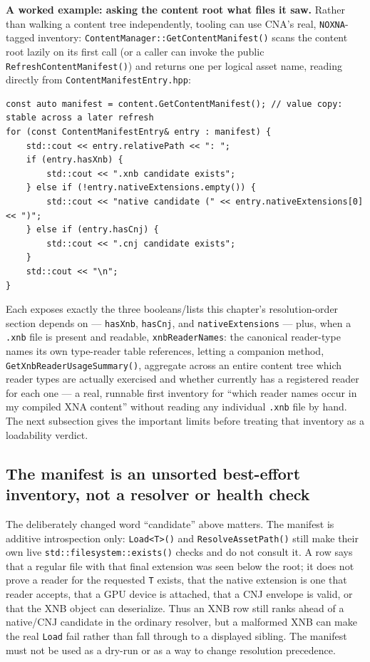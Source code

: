 \begin{sourcenote}
\textbf{A worked example: asking the content root what files it saw.} Rather than walking a
content tree independently, tooling can use CNA's real, \texttt{NOXNA}-tagged inventory:
\texttt{ContentManager::GetContentManifest()} scans the content root lazily on its first call
(or a caller can invoke the public \texttt{RefreshContentManifest()}) and returns one
 per logical asset name, reading directly from
\texttt{ContentManifestEntry.hpp}:

\begin{lstlisting}
const auto manifest = content.GetContentManifest(); // value copy: stable across a later refresh
for (const ContentManifestEntry& entry : manifest) {
    std::cout << entry.relativePath << ": ";
    if (entry.hasXnb) {
        std::cout << ".xnb candidate exists";
    } else if (!entry.nativeExtensions.empty()) {
        std::cout << "native candidate (" << entry.nativeExtensions[0] << ")";
    } else if (entry.hasCnj) {
        std::cout << ".cnj candidate exists";
    }
    std::cout << "\n";
}
\end{lstlisting}

Each  exposes exactly the three booleans/lists this chapter's
resolution-order section depends on --- \texttt{hasXnb}, \texttt{hasCnj}, and
\texttt{nativeExtensions} --- plus, when a \texttt{.xnb} file is present and readable,
\texttt{xnbReaderNames}: the canonical reader-type names its own type-reader table references,
letting a companion method, \texttt{GetXnbReaderUsageSummary()}, aggregate across an entire
content tree which reader types are actually exercised and whether
 currently has a registered reader for each one --- a real,
runnable first inventory for ``which reader names occur in my compiled XNA content'' without
reading any individual \texttt{.xnb} file by hand. The next subsection gives the important
limits before treating that inventory as a loadability verdict.
\end{sourcenote}

\subsection{The manifest is an unsorted best-effort inventory, not a resolver or health check}

The deliberately changed word ``candidate'' above matters. The manifest is additive
introspection only: \texttt{Load<T>()} and \texttt{ResolveAssetPath()} still make their own live
\texttt{std::filesystem::exists()} checks and do not consult it. A row says that a regular file
with that final extension was seen below the root; it does not prove a reader for the requested
\texttt{T} exists, that the native extension is one that reader accepts, that a GPU device is
attached, that a CNJ envelope is valid, or that the XNB object can deserialize. Thus an XNB row
still ranks ahead of a native/CNJ candidate in the ordinary resolver, but a malformed XNB can make
the real \texttt{Load} fail rather than fall through to a displayed sibling. The manifest must
not be used as a dry-run or as a way to change resolution precedence.


